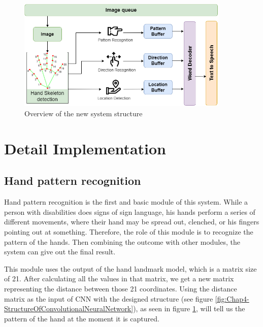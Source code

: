\begin{figure}[H]
	\centering
	\includegraphics[width=0.9\textwidth]{img/Chap4/OverviewOfTheSystemModules-New.png}
	\caption{Overview of the new system structure}
	\label{fig:Chap4-OverviewOfTheSystemModules-New}
\end{figure}

\section{Detail Implementation}\label{sec:DetailImplementation}

\subsection{Hand pattern recognition}

Hand pattern recognition is the first and basic module of this system. While a person with disabilities does signs of sign language, his hands perform a series of different movements, where their hand may be spread out, clenched, or his fingers pointing out at something. Therefore, the role of this module is to recognize the pattern of the hands. Then combining the outcome with other modules, the system can give out the final result.

This module uses the output of the hand landmark model, which is a matrix size of 21. After calculating all the values in that matrix, we get a new matrix representing the distance between those 21 coordinates. Using the distance matrix as the input of CNN with the designed structure (see figure \ref{fig:Chap4-StructureOfConvolutionalNeuralNetwork}), as seen in figure \ref{fig:Chap4-OverviewOfTheSystemModules-New}, will tell us the pattern of the hand at the moment it is captured.

